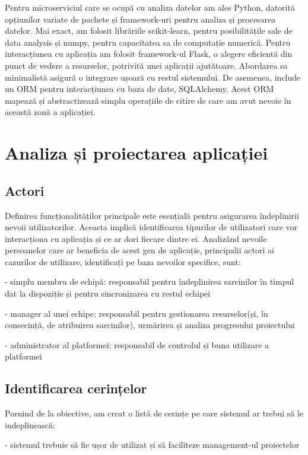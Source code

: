 Pentru microserviciul care se ocupă cu analiza datelor am ales Python, datorită opțiunilor variate de pachete și framework-uri pentru analiza și procesarea datelor. Mai exact, am folosit librăriile scikit-learn, pentru posibilitățile sale de data analysis și numpy, pentru capacitatea sa de computație numerică. Pentru interacțiunea cu aplicația am folosit framework-ul Flask, o alegere eficientă din punct de vedere a resurselor, potrivită unei aplicații ajutătoare. Abordarea sa minimalistă asigură o integrare ușoară cu restul sistemului. De asemenea, include un ORM pentru interacțiunea cu baza de date, SQLAlchemy. Acest ORM mapează și abstractizează simplu operațiile de citire de care am avut nevoie în această zonă a aplicației.

\section{Analiza și proiectarea aplicației}

\subsection{Actori}
Definirea funcționalităților principale este esențială pentru asigurarea îndeplinirii nevoii utilizatorilor. Aceasta implică identificarea tipurilor de utilizatori care vor interacționa cu aplicația și ce ar dori fiecare dintre ei. Analizând nevoile persoanelor care ar beneficia de acest gen de aplicație, principalii actori ai cazurilor de utilizare, identificați pe baza nevoilor specifice, sunt: 

- simplu membru de echipă: responsabil pentru îndeplinirea sarcinilor în timpul dat la dispoziție și pentru sincronizarea cu restul echipei

- manager al unei echipe: responsabil pentru gestionarea resurselor(și, în consecință, de atribuirea sarcinilor), urmărirea și analiza progresului proiectului

- administrator al platformei: responsabil de controlul și buna utilizare a platformei

\subsection{Identificarea cerințelor}
Pornind de la obiective, am creat o listă de cerințe pe care sistemul ar trebui să le indeplinească:

- sistemul trebuie să fie ușor de utilizat și să faciliteze management-ul proiectelor

